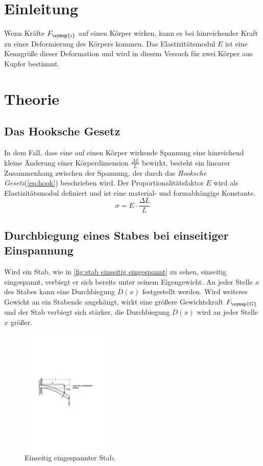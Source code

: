 \section{Einleitung}
Wenn Kräfte $F_{\symup{i}}$ auf einen Körper wirken, kann es bei hinreichender Kraft zu einer Deformierung des Körpers kommen.
Das Elastizitätsmodul $E$ ist eine Kenngröße dieser Deformation und wird in diesem Versuch für zwei Körper aus Kupfer bestimmt.

\section{Theorie}
\label{sec:Theorie}

\subsection{Das Hooksche Gesetz}
\label{sec:hook}
In dem Fall, dass eine auf einen Körper wirkende Spannung eine hinreichend kleine Änderung einer Körperdimension 
$\frac{\Delta L}{L}$ bewirkt, besteht ein linearer Zusammenhang zwischen der Spannung, der durch das 
\textit{Hooksche Gesetz}(\autoref{eq:hook}) beschrieben wird. Der Proportionalitätsfaktor $E$ wird als Elastizitätsmodul 
definiert und ist eine material- und formabhängige Konstante.
\begin{equation}
    \sigma = E \cdot \frac{\Delta L} {L}
    \label{eq:hook}
\end{equation}

\subsection{Durchbiegung eines Stabes bei einseitiger Einspannung}
\label{sec:einseitig}
Wird ein Stab, wie in \autoref{fig:stab einseitig eingespannt} zu sehen, einseitig eingespannt, verbiegt er sich bereits 
unter seinem Eigengewicht. An jeder Stelle $x$ des Stabes kann eine Durchbiegung $D(x)$ festgestellt werden.
Wird weiteres Gewicht an ein Stabende angehängt, wirkt eine größere Gewichtskraft $F_{\symup{G}}$ und der Stab 
verbiegt sich stärker, die Durchbiegung $D(x)$ wird an jeder Stelle $x$ größer.
\begin{figure}
    \centering
    \includegraphics[height=6cm]{content/Abbildungen/stab_einseitig_eingespannt.pdf}
    \caption{Einseitig eingespannter Stab. \cite{v103}}
    \label{fig:stab einseitig eingespannt}
\end{figure}

